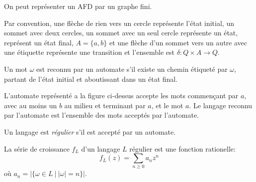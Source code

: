   \begin{ex}
    On peut représenter un AFD par un graphe fini.
    
    \begin{center}
    \end{center}

    Par convention, une flèche de rien vers un cercle représente l'état initial, un sommet avec deux cercles,
    un sommet avec un seul cercle représente un état,
    représent un état final, $A = \{a, b\}$ et une flèche d'un sommet vers un autre avec une étiquette
    représente une transition et l'ensemble est $\delta: Q \times A \to Q$.

    Un mot $\omega$ est reconnu par un automate s'il existe un chemin étiqueté par $\omega$, partant de l'état
    initial et aboutissant dans un état final.

    L'automate représenté a la figure ci-dessus accepte les mots commençant par $a$, avec au moins un $b$ au
    milieu et terminant par $a$, et le mot $a$. Le langage reconnu par l'automate est l'ensemble des mots
    acceptés par l'automate.
  \end{ex}


  \begin{defi}
    Un langage est \emph{régulier}  s'il est accepté par un automate.
  \end{defi}

  


  \begin{prop}
    La série de croissance $f_L$ d'un langage $L$ régulier est une fonction rationelle:
      \[f_L(z) = \sum_{n \geq 0}a_nz^n\]
    où $a_n = \left| \{ \omega \in L\ |\ |\omega| = n\} \right|$. 
  \end{prop}

